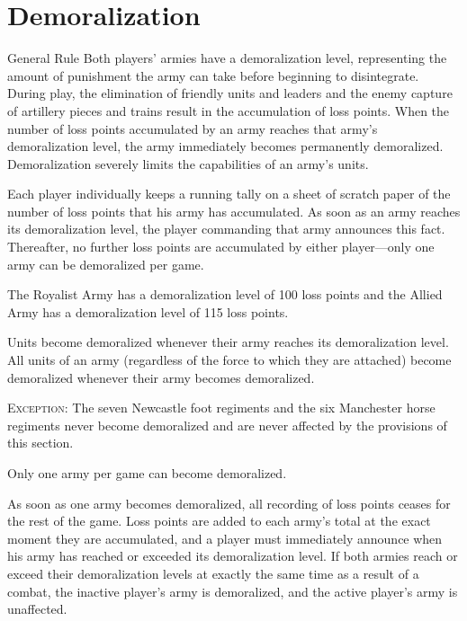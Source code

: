 \section{Demoralization}

\begin{rulebox}{General Rule}
Both players' armies have a demoralization level, representing the amount of punishment the army can take before beginning to disintegrate. During play, the elimination of friendly units and leaders and the enemy capture of artillery pieces and trains result in the accumulation of loss points. When the number of loss points accumulated by an army reaches that army's demoralization level, the army immediately becomes permanently demoralized. Demoralization severely limits the capabilities of an army's units.
\end{rulebox}


Each player individually keeps a running tally on a sheet of scratch paper of the number of loss points that his army has accumulated. As soon as an army reaches its demoralization level, the player commanding that army announces this fact. Thereafter, no further loss points are accumulated by either player---only one army can be demoralized per game.

 The Royalist Army has a demoralization level of 100 loss points and the Allied Army has a demoralization level of 115 loss points.

 Units become demoralized whenever their army reaches its demoralization level. All units of an army (regardless of the force to which they are attached) become demoralized whenever their army becomes demoralized.

\textsc{Exception:} The seven Newcastle foot regiments and the six Manchester horse regiments never become demoralized and are never affected by the provisions of this section.

 Only one army per game can become demoralized.

As soon as one army becomes demoralized, all recording of loss points ceases for the rest of the game. Loss points are added to each army's total at the exact moment they are accumulated, and a player must immediately announce when his army has reached or exceeded its demoralization level. If both armies reach or exceed their demoralization levels at exactly the same time as a result of a combat, the inactive player's army is demoralized, and the active player's army is unaffected.

